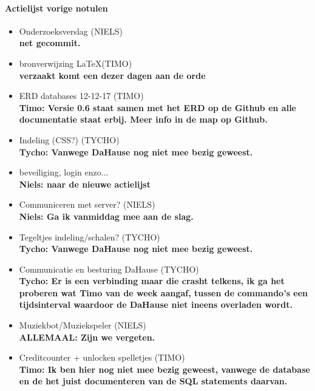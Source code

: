 \documentclass[11pt]{article}
\begin{document}
\paragraph{Actielijst vorige notulen}
\begin{itemize}
\item Onderzoeksverslag (NIELS) \\
\textbf{net gecommit.}
\item bronverwijzing \LaTeX (TIMO)\\
\textbf{verzaakt komt een dezer dagen aan de orde}
\item ERD databases 12-12-17 (TIMO)\\
\textbf{Timo: Versie 0.6 staat samen met het ERD op de
Github en alle documentatie staat erbij. Meer info in de map 
op Github.}
\item Indeling (CSS?) (TYCHO)\\
\textbf{Tycho: Vanwege DaHause nog niet mee bezig geweest.}
\item beveiliging, login enzo... \\\textbf{Niels: naar de nieuwe actielijst}
\item Communiceren met server? (NIELS)\\
\textbf{Niels: Ga ik vanmiddag mee aan de slag.}
\item Tegeltjes indeling/schalen? (TYCHO)\\
\textbf{Tycho: Vanwege DaHause nog niet mee bezig geweest.}
\item Communicatie en besturing DaHause (TYCHO)\\
\textbf{Tycho: Er is een verbinding maar die crasht telkens, ik ga het proberen wat Timo van de week aangaf, tussen de commando's een tijdsinterval waardoor de DaHause niet ineens overladen wordt. }
\item Muziekbot/Muziekspeler (NIELS)\\
\textbf{ALLEMAAL: Zijn we vergeten. }
\item Creditcounter + unlocken spelletjes (TIMO)\\
\textbf{Timo: Ik ben hier nog niet mee bezig geweest, vanwege de database en de het juist documenteren van de SQL statements daarvan.}
\end{itemize}

\newpage
\end{document}
